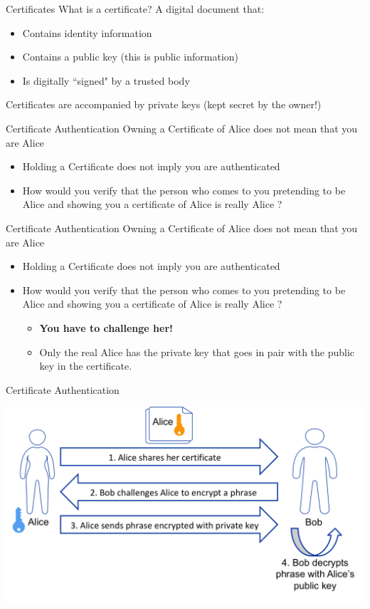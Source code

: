 \documentclass{beamer}
\begin{document}
\begin{frame}{Certificates}
What is a certificate? A digital document that:
\begin{itemize}
\item Contains identity information
\item Contains a public key (this is public information)
\item Is digitally ``signed" by a trusted body 
\end{itemize}
Certificates are accompanied by private keys (kept secret by the owner!)
\end{frame}

\begin{frame}{Certificate Authentication}
Owning a Certificate of Alice does not mean that you are Alice
\begin{itemize}
\item Holding a Certificate does not imply you are authenticated
\item How would you verify that the person who comes to you pretending to be Alice and showing you a certificate of Alice is really Alice ?
\end{itemize}
\end{frame}

\begin{frame}{Certificate Authentication}
Owning a Certificate of Alice does not mean that you are Alice
\begin{itemize}
\item Holding a Certificate does not imply you are authenticated
\item How would you verify that the person who comes to you pretending to be Alice and showing you a certificate of Alice is really Alice ?
\begin{itemize}
\item \textbf{You have to challenge her!}
\item Only the real Alice has the private key that goes in pair with the public key in the certificate.
\end{itemize}
\end{itemize}
\end{frame}

\begin{frame}{{\color{red}Certificate Authentication}}
\begin{center}
\includegraphics[width=0.9\linewidth]{certificate-verification.png}
\end{center}
\end{frame}
\end{document}
